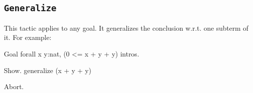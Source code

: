 %
%

\subsection{\tt Generalize \term}
\label{Generalize}
This tactic applies to any goal. It generalizes the conclusion w.r.t. one
subterm of it. For example:

\begin{coq_eval}
Goal forall x y:nat, (0 <= x + y + y)%
intros.
\end{coq_eval}
\begin{coq_example}
Show.
generalize (x + y + y)%
\end{coq_example}

\begin{coq_eval}
Abort.
\end{coq_eval}

